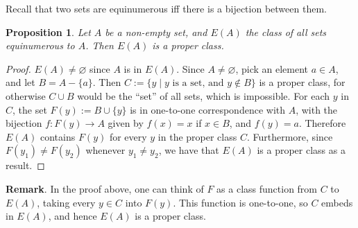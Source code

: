 \documentclass[12pt]{article}
\newtheorem{prop}{Proposition}
\begin{document}
Recall that two sets are equinumerous iff there is a bijection between them.

\begin{prop} Let $A$ be a non-empty set, and $E(A)$ the class of all sets equinumerous to $A$.  Then $E(A)$ is a proper class. \end{prop}
\begin{proof}  $E(A)\ne \varnothing$ since $A$ is in $E(A)$.  Since $A\ne \varnothing$, pick an element $a\in A$, and let $B=A-\lbrace a\rbrace$.  Then $C:=\lbrace y\mid y\mbox{ is a set, and }y\notin B\rbrace$ is a proper class, for otherwise $C\cup B$ would be the ``set'' of all sets, which is impossible.  For each $y$ in $C$, the set $F(y):=B\cup \lbrace y\rbrace$ is in one-to-one correspondence with $A$, with the bijection $f:F(y)\to A$ given by $f(x)=x$ if $x\in B$, and $f(y)=a$.  Therefore $E(A)$ contains $F(y)$ for every $y$ in the proper class $C$.  Furthermore, since $F(y_1)\ne F(y_2)$ whenever $y_1\ne y_2$, we have that $E(A)$ is a proper class as a result.
\end{proof}

\textbf{Remark}.  In the proof above, one can think of $F$ as a class function from $C$ to $E(A)$, taking every $y\in C$ into $F(y)$.  This function is one-to-one, so $C$ embeds in $E(A)$, and hence $E(A)$ is a proper class.
\end{document}
